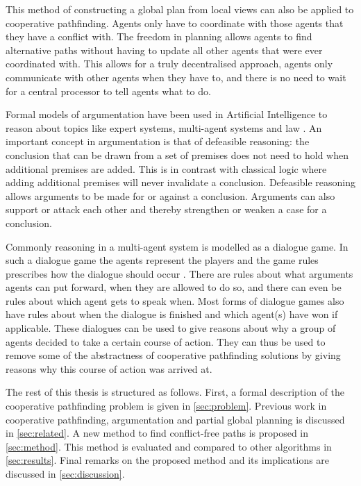 This method of constructing a global plan from local views can also be applied
to cooperative pathfinding. Agents only have to coordinate with those agents
that they have a conflict with. The freedom in planning allows agents to find
alternative paths without having to update all other agents that were ever
coordinated with. This allows for a truly decentralised approach,
agents only communicate with other agents when they have to, and there is no
need to wait for a central processor to tell agents what to do.

Formal models of argumentation have been used in Artificial Intelligence to
reason about topics like expert systems, multi-agent systems and law
\cite{vaneemeren2014}.
An important concept in argumentation is that of defeasible reasoning: the
conclusion that can be drawn from a set of premises does not need to hold when
additional premises are added. This is in contrast with classical logic where
adding additional premises will never invalidate a conclusion. Defeasible
reasoning allows arguments to be made for or against a conclusion. Arguments
can also support or attack each other and thereby strengthen or weaken a
case for a conclusion.

Commonly reasoning in a multi-agent system is modelled as a dialogue game. In
such a dialogue game the agents represent the players and the game rules
prescribes how the dialogue should occur \cite{walton1995}. There are rules
about what
arguments agents can put forward, when they are allowed to do so, and there can
even be rules about which agent gets to speak when. Most forms of dialogue
games also have rules about when the dialogue is finished and which agent(s)
have won if applicable. These dialogues can be used to give reasons about why a
group of agents decided to take a certain course of action. They can thus be
used to remove some of the abstractness of cooperative pathfinding solutions by
giving reasons why this course of action was arrived at.


The rest of this thesis is structured as follows. First, a formal description
of the cooperative pathfinding problem is given in \autoref{sec:problem}.
Previous work in cooperative pathfinding, argumentation and partial global
planning is discussed in \autoref{sec:related}. A new method to find
conflict-free paths is proposed in \autoref{sec:method}. This method is
evaluated and compared to other algorithms in \autoref{sec:results}. Final
remarks on the proposed method and its implications are discussed in
\autoref{sec:discussion}.
